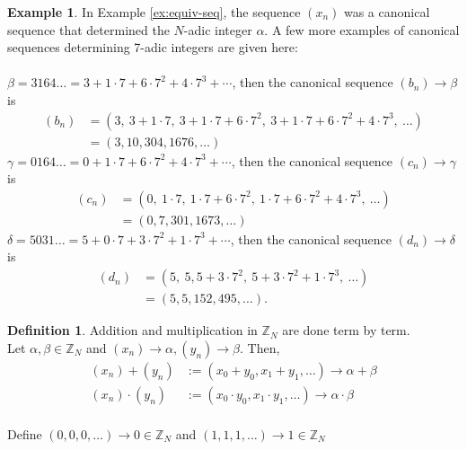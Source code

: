 \documentclass[english]{article}
\def\zzzn{\mathbb{Z}_N}
\def\xn{(x_n)}
\def\yn{(y_n)}
\theoremstyle{plain}
\theoremstyle{definition}
\newtheorem{definition}[theorem]{Definition}%
\newtheorem{example}[theorem]{Example}
\theoremstyle{remark}
\begin{document}
\begin{example} \label{ex:canon}
  In Example \ref{ex:equiv-seq}, the sequence $\xn$ was a canonical
  sequence that determined the $N$-adic integer $\alpha$. A few more examples
  of canonical sequences determining 7-adic integers are given here:\\
  \\
 $\beta = 3164\dots = 3+1\cdot7+6\cdot7^2+4\cdot7^3+\cdots$, then the canonical sequence $(b_n) \rightarrow \beta$ is
  \begin{align*}
    (b_n) &= (3, \ 3+1\cdot7, \ 3+1\cdot7+6\cdot7^2, \ 3+1\cdot7+6\cdot7^2+4\cdot7^3, \ \dots)\\
            &= (3,10,304,1676,\dots)
  \end{align*}
  $\gamma = 0164\dots = 0+1\cdot7+6\cdot7^2+4\cdot7^3+\cdots$, then the canonical sequence $(c_n) \rightarrow \gamma$ is
  \begin{align*}
    (c_n) &= (0, \ 1\cdot7, \ 1\cdot7+6\cdot7^2, \ 1\cdot7+6\cdot7^2+4\cdot7^3, \ \dots)\\
            &= (0,7,301,1673,\dots)
  \end{align*}
  $\delta = 5031\dots = 5+0\cdot7+3\cdot7^2+1\cdot7^3+\cdots$, then the canonical sequence $(d_n) \rightarrow \delta$ is
  \begin{align*}
    (d_n) &= (5, \ 5, 5+3\cdot7^2, \ 5+3\cdot7^2+1\cdot7^3, \ \dots)\\
            &= (5,5,152,495,\dots).
  \end{align*}
\end{example}

\begin{definition}
  Addition and multiplication in $\zzzn$ are done term by term. \\
  Let $\alpha,\beta \in \zzzn$ and $\xn \rightarrow \alpha, \yn \rightarrow \beta$. Then,
  \begin{align*}
    \xn+\yn     &:= (x_0+y_0, x_1+y_1, \dots) \rightarrow \alpha+\beta\\
    \xn\cdot\yn &:= (x_0 \cdot y_0, x_1 \cdot y_1, \dots) \rightarrow \alpha \cdot \beta\\ 
  \end{align*}

  Define $(0,0,0,\dots) \rightarrow 0 \in \zzzn$ and $(1,1,1,\dots) \rightarrow 1 \in \zzzn$
\end{definition}
\end{document}
